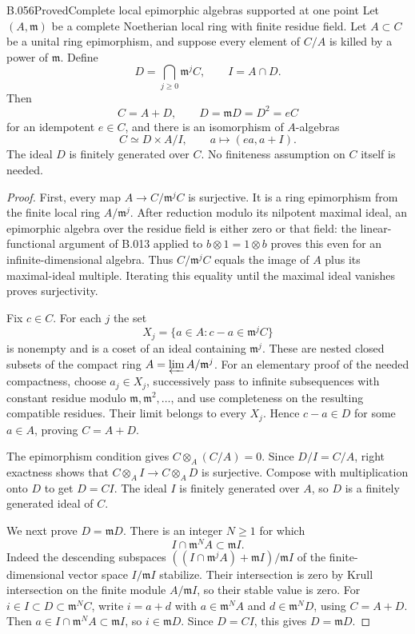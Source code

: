 \begin{saresult}{B.056}{Proved}{Complete local epimorphic algebras supported at one point}
Let $(A,\mathfrak m)$ be a complete Noetherian local ring
with finite residue field. Let $A\subset C$ be a unital
ring epimorphism, and suppose every element of $C/A$ is
killed by a power of $\mathfrak m$. Define
\[
 D=\bigcap_{j\ge0}\mathfrak m^j C,\qquad I=A\cap D.
\]
Then
\[
 C=A+D,\qquad D=\mathfrak mD=D^2=eC
                                                               \tag{B56.1}
\]
for an idempotent $e\in C$, and there is an isomorphism
of $A$-algebras
\[
 C\simeq D\times A/I,\qquad
 a\longmapsto(ea,a+I).                                    \tag{B56.2}
\]
The ideal $D$ is finitely generated over $C$. No finiteness
assumption on $C$ itself is needed.
\end{saresult}
\begin{proof}
First, every map $A\to C/\mathfrak m^jC$ is surjective.
It is a ring epimorphism from the finite local ring
$A/\mathfrak m^j$. After reduction modulo its nilpotent
maximal ideal, an epimorphic algebra over the residue
field is either zero or that field: the linear-functional
argument of B.013 applied to $b\otimes1=1\otimes b$
proves this even for an infinite-dimensional algebra.
Thus $C/\mathfrak m^jC$ equals the image of $A$ plus
its maximal-ideal multiple. Iterating this equality
until the maximal ideal vanishes proves surjectivity.

Fix $c\in C$. For each $j$ the set
\[
 X_j=\{a\in A:c-a\in\mathfrak m^jC\}
\]
is nonempty and is a coset of an ideal containing
$\mathfrak m^j$. These are nested closed subsets of
the compact ring $A=\varprojlim A/\mathfrak m^j$.
For an elementary proof of the needed compactness,
choose $a_j\in X_j$, successively pass to infinite
subsequences with constant residue modulo
$\mathfrak m,\mathfrak m^2,\ldots$, and use completeness
on the resulting compatible residues. Their limit
belongs to every $X_j$. Hence $c-a\in D$ for some
$a\in A$, proving $C=A+D$.

The epimorphism condition gives
$C\otimes_A(C/A)=0$. Since $D/I=C/A$, right exactness
shows that $C\otimes_A I\to C\otimes_A D$ is surjective.
Compose with multiplication onto $D$ to get $D=CI$.
The ideal $I$ is finitely generated over $A$, so $D$
is a finitely generated ideal of $C$.

We next prove $D=\mathfrak mD$. There is an integer
$N\ge1$ for which
\[
                       I\cap\mathfrak m^N A\subset\mathfrak mI.
                                                               \tag{B56.3}
\]
Indeed the descending subspaces
$((I\cap\mathfrak m^jA)+\mathfrak mI)/\mathfrak mI$
of the finite-dimensional vector space $I/\mathfrak mI$
stabilize. Their intersection is zero by Krull
intersection on the finite module $A/\mathfrak mI$,
so their stable value is zero.
For $i\in I\subset D\subset\mathfrak m^NC$, write
$i=a+d$ with $a\in\mathfrak m^NA$ and
$d\in\mathfrak m^ND$, using $C=A+D$.
Then $a\in I\cap\mathfrak m^NA\subset\mathfrak mI$,
so $i\in\mathfrak mD$. Since $D=CI$, this gives
$D=\mathfrak mD$.


\end{proof}
